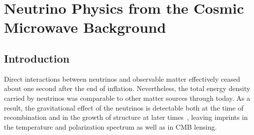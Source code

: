  
\chapter{Neutrino Physics from the Cosmic Microwave Background}

\def\beq{\begin{equation}}
\def\eeq{\end{equation}}

\def\bea{\begin{eqnarray}}
\def\eea{\end{eqnarray}}

\def\Neff{N_{\rm eff}}
\def\Nf{N_{\rm eff}}
\newcommand{\nucl}[3]{ \ensuremath{ \phantom{\ensuremath{^{#1}_{#2}}} \llap{\ensuremath{^{#1}}} \llap{\ensuremath{_{\rule{0pt}{.75em}#2}}} \mbox{#3} } }


\def\gtrsim{\raise-.75ex\hbox{$\buildrel>\over\sim$}}

\section{Introduction}

Direct interactions between neutrinos and observable matter effectively ceased about one second after the end of inflation.  Nevertheless, the total energy density carried by neutrinos was comparable to other matter sources through today.  As a result, the gravitational effect of the neutrinos is detectable both at the time of recombination and in the growth of structure at later times~\cite{Abazajian:2013oma}, leaving imprints in the temperature and polarization spectrum as well as in CMB lensing.

